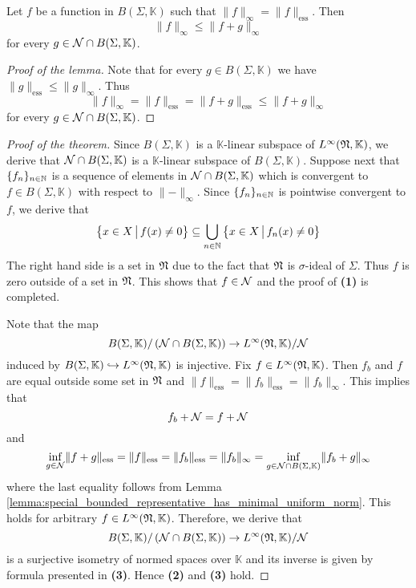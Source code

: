 \begin{lemma}\label{lemma:special_bounded_representative_has_minimal_uniform_norm}
    Let $f$ be a function in $B(\Sigma, \mathbb{K})$ such that $\lVert f \rVert_{\infty} = \lVert f \rVert_{\mathrm{ess}}$. Then
    $$\lVert f \rVert_{\infty} \leq \lVert f + g \rVert_{\infty}$$
    for every $g \in {\mathcal N} \cap B(\Sigma, \mathbb{K})$.
\end{lemma}
\begin{proof}[Proof of the lemma]
    Note that for every $g \in B(\Sigma, \mathbb{K})$ we have $\lVert g \rVert_{\mathrm{ess}} \leq \lVert g \rVert_{\infty}$. Thus
    $$\lVert f \rVert_{\infty} = \lVert f \rVert_{\mathrm{ess}} = \lVert f + g \rVert_{\mathrm{ess}} \leq \lVert f + g \rVert_{\infty}$$
    for every $g \in {\mathcal N} \cap B(\Sigma, \mathbb{K})$.
\end{proof}

\begin{proof}[Proof of the theorem]
    Since $B(\Sigma,\mathbb{K})$ is a $\mathbb{K}$-linear subspace of $L^{\infty}({\mathfrak N},\mathbb{K})$, we derive that ${\mathcal N}\cap B(\Sigma, \mathbb{K})$ is a $\mathbb{K}$-linear subspace of $B(\Sigma,\mathbb{K})$. Suppose next that $\{f_n\}_{n \in {\mathbb N}}$ is a sequence of elements in ${\mathcal N}\cap B(\Sigma,\mathbb{K})$ which is convergent to $f \in B(\Sigma,\mathbb{K})$ with respect to $\lVert - \rVert_{\infty}$. Since $\{f_n\}_{n\in {\mathbb N}}$ is pointwise convergent to $f$, we derive that
    $$\big\{x\in X\,\big|\,f(x) \neq 0\big\} \subseteq \bigcup_{n\in {\mathbb N}}\big\{x\in X\,\big|\,f_n(x) \neq 0\big\}$$
    The right hand side is a set in ${\mathfrak N}$ due to the fact that ${\mathfrak N}$ is $\sigma$-ideal of $\Sigma$. Thus $f$ is zero outside of a set in ${\mathfrak N}$. This shows that $f \in {\mathcal N}$ and the proof of \textbf{(1)} is completed.

    Note that the map
    $$B(\Sigma,\mathbb{K})/\left({\mathcal N}\cap B(\Sigma,\mathbb{K})\right) \rightarrow L^{\infty}({\mathfrak N},\mathbb{K})/{\mathcal N}$$
    induced by $B(\Sigma, \mathbb{K})\hookrightarrow L^{\infty}({\mathfrak N},\mathbb{K})$ is injective. Fix $f \in L^{\infty}({\mathfrak N},\mathbb{K})$. Then $f_b$ and $f$ are equal outside some set in ${\mathfrak N}$ and $\lVert f \rVert_{\mathrm{ess}} = \lVert f_b\rVert_{\mathrm{ess}} = \lVert f_b \rVert_{\infty}$. This implies that
    $$f_b + {\mathcal N} = f + {\mathcal N}$$
    and
    $$\inf_{g \in {\mathcal N}} \lVert f + g \rVert_{\mathrm{ess}} = \lVert f \rVert_{\mathrm{ess}} = \lVert f_b \rVert_{\mathrm{ess}} = \lVert f_b \rVert_{\infty} =  \inf_{g \in {\mathcal N} \cap B(\Sigma, \mathbb{K})}\lVert f_b + g\rVert_{\infty}$$
    where the last equality follows from Lemma \ref{lemma:special_bounded_representative_has_minimal_uniform_norm}. This holds for arbitrary $f \in L^{\infty}({\mathfrak N},\mathbb{K})$. Therefore, we derive that
    $$B(\Sigma,\mathbb{K})/\left({\mathcal N}\cap B(\Sigma,\mathbb{K})\right) \rightarrow L^{\infty}({\mathfrak N},\mathbb{K})/{\mathcal N}$$
    is a surjective isometry of normed spaces over $\mathbb{K}$ and its inverse is given by formula presented in \textbf{(3)}. Hence \textbf{(2)} and \textbf{(3)} hold.
\end{proof}

